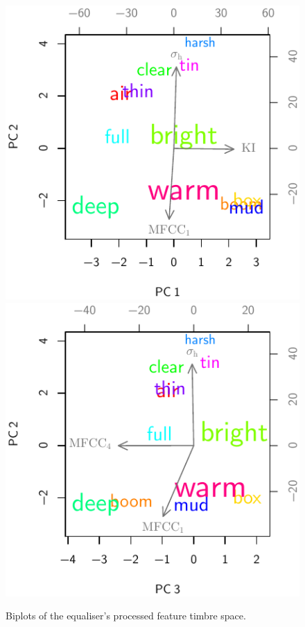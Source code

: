 			\begin{figure}[h!]
				\centering
				\subfloat
				{
					\includegraphics{chapter4/Images/EqualiserProcessedCentroidsPCA1-2.pdf}
					\label{fig:EqualiserProcessedCentroidsPCA1-2}
				}
				\quad
				\subfloat
				{
					\includegraphics{chapter4/Images/EqualiserProcessedCentroidsPCA3-2.pdf}
					\label{fig:EqualiserProcessedCentroidsPCA3-2}
				}
				\caption{Biplots of the equaliser's processed feature timbre space.}
				\label{fig:EqualiserProcessedCentroidsPCAs}
			\end{figure}


